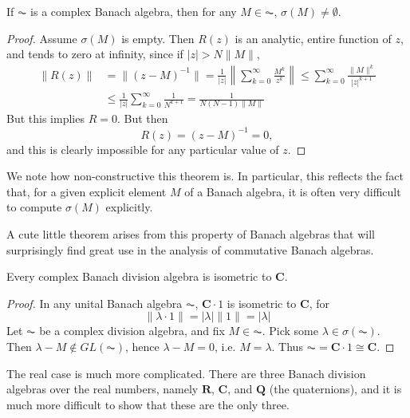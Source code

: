 \begin{theorem} If $\AC$ is a complex Banach algebra, then for any $M \in \AC$, $\sigma(M) \neq \emptyset$.
\end{theorem}
\begin{proof}
    Assume $\sigma(M)$ is empty. Then $R(z)$ is an analytic, entire function of $z$, and tends to zero at infinity, since if $|z| > N \| M \|$,
    \begin{align*}
        \| R(z) \| &= \| (z - M)^{-1} \| = \frac{1}{|z|} \left\| \sum_{k = 0}^\infty \frac{M^k}{z^k} \right\| \leq \sum_{k = 0}^\infty \frac{\| M \|^k}{|z|^{k+1}}\\
        &\leq \frac{1}{|z|} \sum_{k = 0}^\infty \frac{1}{N^{k+1}} = \frac{1}{N(N - 1)\|M\|}
    \end{align*}
    But this implies $R = 0$. But then
    \[ R(z) = (z - M)^{-1} = 0, \]
    and this is clearly impossible for any particular value of $z$.
\end{proof}

\begin{remark}
    We note how non-constructive this theorem is. In particular, this reflects the fact that, for a given explicit element $M$ of a Banach algebra, it is often very difficult to compute $\sigma(M)$ explicitly.
\end{remark}

A cute little theorem arises from this property of Banach algebras that will surprisingly find great use in the analysis of commutative Banach algebras.

\begin{corollary}
    Every complex Banach division algebra is isometric to $\mathbf{C}$.
\end{corollary}
\begin{proof}
    In any unital Banach algebra $\AC$, $\mathbf{C} \cdot 1$ is isometric to $\mathbf{C}$, for
    \[ \| \lambda \cdot 1 \| = |\lambda| \| 1 \| = |\lambda| \]
    Let $\AC$ be a complex division algebra, and fix $M \in \AC$. Pick some $\lambda \in \sigma(\AC)$. Then $\lambda - M \not \in GL(\AC)$, hence $\lambda - M = 0$, i.e. $M = \lambda$. Thus $\AC = \mathbf{C} \cdot 1 \cong \mathbf{C}$.
\end{proof}

The real case is much more complicated. There are three Banach division algebras over the real numbers, namely $\mathbf{R}$, $\mathbf{C}$, and $\mathbf{Q}$ (the quaternions), and it is much more difficult to show that these are the only three.

